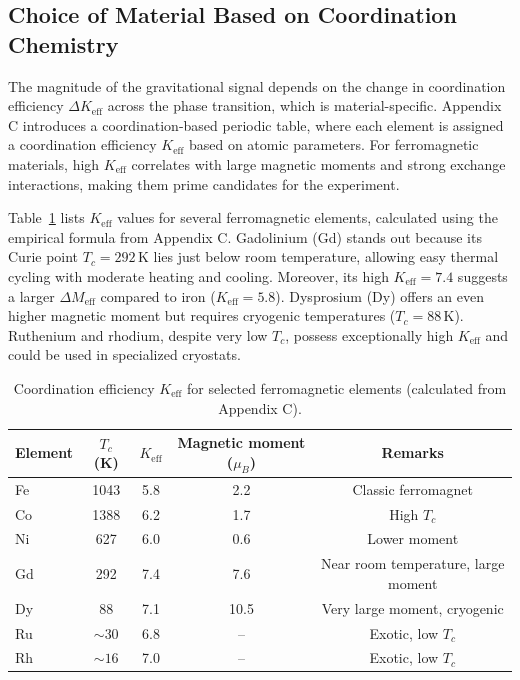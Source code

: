 \documentclass[12pt]{article}
\theoremstyle{remark}
\newcommand{\Keff}{K_{\mathrm{eff}}}
\begin{document}
	\subsection{Choice of Material Based on Coordination Chemistry}
	\label{subsec:material-choice}
	
	The magnitude of the gravitational signal depends on the change in coordination efficiency \(\Delta \Keff\) across the phase transition, which is material-specific. Appendix C introduces a coordination-based periodic table, where each element is assigned a coordination efficiency \(\Keff\) based on atomic parameters. For ferromagnetic materials, high \(\Keff\) correlates with large magnetic moments and strong exchange interactions, making them prime candidates for the experiment.
	
	Table~\ref{tab:ferro-keff-appP} lists \(\Keff\) values for several ferromagnetic elements, calculated using the empirical formula from Appendix C. Gadolinium (Gd) stands out because its Curie point \(T_c = 292\,\mathrm{K}\) lies just below room temperature, allowing easy thermal cycling with moderate heating and cooling. Moreover, its high \(\Keff = 7.4\) suggests a larger \(\Delta M_{\mathrm{eff}}\) compared to iron (\(\Keff = 5.8\)). Dysprosium (Dy) offers an even higher magnetic moment but requires cryogenic temperatures (\(T_c = 88\,\mathrm{K}\)). Ruthenium and rhodium, despite very low \(T_c\), possess exceptionally high \(\Keff\) and could be used in specialized cryostats.
	
	\begin{table}[htbp]
		\centering
		\caption{Coordination efficiency \(\Keff\) for selected ferromagnetic elements (calculated from Appendix C).}
		\label{tab:ferro-keff-appP}
		\begin{tabular}{lcccc}
			\toprule
			Element & \(T_c\) (K) & \(\Keff\) & Magnetic moment (\(\mu_B\)) & Remarks \\
			\midrule
			Fe & 1043 & 5.8 & 2.2 & Classic ferromagnet \\
			Co & 1388 & 6.2 & 1.7 & High \(T_c\) \\
			Ni & 627  & 6.0 & 0.6 & Lower moment \\
			Gd & 292  & 7.4 & 7.6 & Near room temperature, large moment \\
			Dy & 88   & 7.1 & 10.5 & Very large moment, cryogenic \\
			Ru & \(\sim 30\) & 6.8 & -- & Exotic, low \(T_c\) \\
			Rh & \(\sim 16\) & 7.0 & -- & Exotic, low \(T_c\) \\
			\bottomrule
		\end{tabular}
	\end{table}
	
\end{document}
